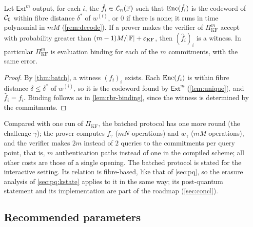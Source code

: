 \begin{corollary}\label{cor:batch}
Let $\mathsf{Ext}^m$ output, for each $i$, the $\hat f_i \in \mathcal{L}_n(\mathbb{F})$ such that $\mathrm{Enc}(\hat f_i)$ is the codeword of $\mathcal{C}_0$ within fibre distance $\delta^*$ of $w^{(i)}$, or $0$ if there is none; it runs in time polynomial in $mM$ (\cref{rem:decode}).
If a prover makes the verifier of $\Pi^m_{\mathrm{KF}}$ accept with probability greater than $(m-1)M/|\mathbb{F}| + \varepsilon_{\mathrm{KF}}$, then $(\hat f_i)_i$ is a witness. In particular $\Pi^m_{\mathrm{KF}}$ is evaluation binding for each of the $m$ commitments, with the same error.
\end{corollary}

\begin{proof}
By \cref{thm:batch}, a witness $(f_i)_i$ exists. Each $\mathrm{Enc}(f_i)$ is within fibre distance $\delta \le \delta^*$ of $w^{(i)}$, so it is the codeword found by $\mathsf{Ext}^m$ (\cref{lem:unique}), and $\hat f_i = f_i$. Binding follows as in \cref{lem:rbr-binding}, since the witness is determined by the commitments.
\end{proof}

\begin{remark}\label{rem:batch}
Compared with one run of $\Pi_{\mathrm{KF}}$, the batched protocol has one more round (the challenge $\gamma$); the prover computes $f_\gamma$ ($mN$ operations) and $w_\gamma$ ($mM$ operations), and the verifier makes $2m$ instead of $2$ queries to the commitments per query point, that is, $m$ authentication paths instead of one in the compiled scheme; all other costs are those of a single opening.
The batched protocol is stated for the interactive setting. Its relation is fibre-based, like that of \cref{sec:pq}, so the erasure analysis of \cref{sec:pq:kstate} applies to it in the same way; its post-quantum statement and its implementation are part of the roadmap (\cref{sec:concl}).
\end{remark}

\subsection{Recommended parameters}\label{sec:apps:params}

